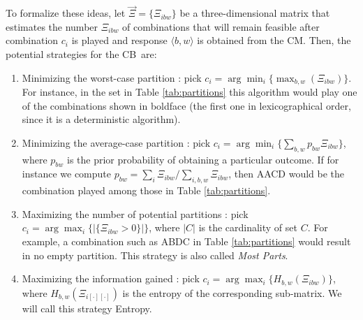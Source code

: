 \documentclass[preprint,12pt]{elsarticle}
\def\codemaker{CM}
\def\codebreaker{CB}
\begin{document}
To formalize these ideas, let ${\vec \Xi}=\{\Xi_{ibw}\}$ be a
three-dimensional matrix that
estimates the number $\Xi_{ibw}$ of combinations that will remain feasible
after combination $c_i$ is played and response $\langle b, w\rangle$
is obtained from the \codemaker. Then, the potential strategies for the \codebreaker\ are:
\begin{enumerate}
    \item Minimizing the worst-case partition \cite{Knuth}: pick $c_i=\arg\min_i\{\max_{b,w}(\Xi_{ibw})\}$. For
instance, in the set in Table \ref{tab:partitions} this algorithm
would play one of the combinations shown in boldface (the first one in
lexicographical order, since it is a deterministic algorithm).
    \item Minimizing the average-case partition \cite{Berghman20091880,irving}: pick $c_i=\arg\min_i\{\sum_{b,w}p_{bw}\Xi_{ibw}\}$, where $p_{bw}$
    is the prior probability of obtaining a particular outcome. If for instance we compute $p_{bw} = \sum_i\Xi_{ibw}/\sum_{i,b,w}\Xi_{ibw}$, then AACD would be the combination played among those in Table \ref{tab:partitions}.
    \item Maximizing the number of potential partitions \cite{Kooi200513}: pick $c_i=\arg\max_i\{|\{\Xi_{ibw}>0\}|\}$, where $|C|$ is
the cardinality of set $C$.  For example, a combination such as ABDC in Table \ref{tab:partitions} would result in no empty partition. This strategy is also called \emph{Most Parts}.
\item Maximizing the information gained \cite{Neuwirth,bestavros,mm:ppsn:2010}: pick
    $c_i=\arg\max_i\{H_{b,w}\left(\Xi_{ibw}\right)\}$,
    where $H_{b,w}(\Xi_{i[\cdot][\cdot]})$ is the entropy of the corresponding
    sub-matrix. We will call this strategy Entropy. 
 \end{enumerate}
\end{document}
